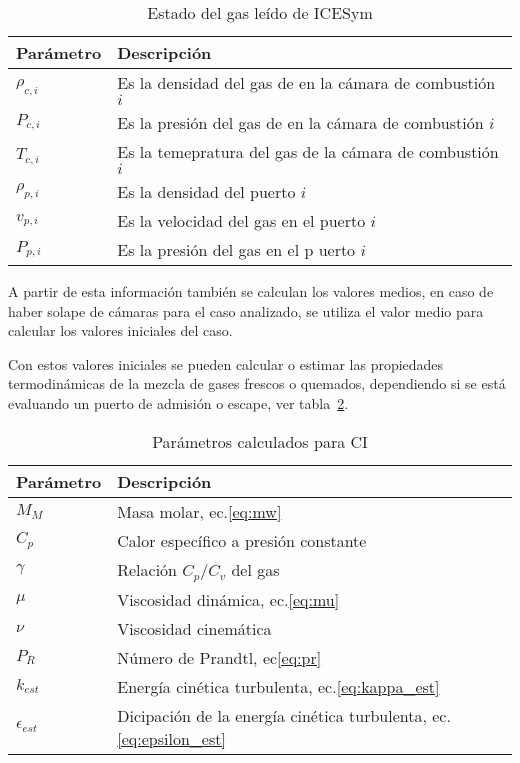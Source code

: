 \begin{table}
  \centering
  \begin{tabular}{ll}\toprule
    Parámetro & Descripción \\ \midrule
    $\rho_{c,i}$ & Es la densidad del gas de en la cámara de combustión $i$\\
    $P_{c,i}$ & Es la presión del gas de en la cámara de combustión $i$ \\
    $T_{c,i}$ & Es la temepratura del gas de la cámara de combustión $i$ \\
    $\rho_{p,i}$ & Es la densidad del puerto $i$ \\
    $v_{p,i}$ & Es la velocidad del gas en el puerto $i$ \\
    $P_{p,i}$ & Es la presión del gas en el p uerto $i$ \\ \bottomrule
    \end{tabular}
    \caption{Estado del gas leído de ICESym}\label{tab:estado_gas_icesym}
\end{table}

A partir de esta información también se calculan los valores medios, en caso de
haber solape de cámaras para el caso analizado, se utiliza el valor medio para
calcular los valores iniciales del caso.

Con estos valores iniciales se pueden calcular o estimar las propiedades
termodinámicas de la mezcla de gases frescos o quemados, dependiendo si se está
evaluando un puerto de admisión o escape, ver tabla~\ref{tab:ci_calculados}.
%

\begin{table}
  \centering
  \begin{tabular}{ll}\toprule
    Parámetro & Descripción \\ \midrule
    $M_{M}$ & Masa molar, ec.\ref{eq:mw} \\
    $C_{p}$ & Calor específico a presión constante \\
    $\gamma$ & Relación $C_{p}/C_{v}$ del gas \\
    $\mu$ & Viscosidad dinámica, ec.\ref{eq:mu} \\
    $\nu$ & Viscosidad cinemática \\
    $P_{R}$ & Número de Prandtl, ec\ref{eq:pr}\\
    $k_{est}$ & Energía cinética turbulenta, ec.\ref{eq:kappa_est} \\ \bottomrule
    $\epsilon_{est}$ & Dicipación de la energía cinética turbulenta, ec.\ref{eq:epsilon_est}\\
    \end{tabular}
    \caption{Parámetros calculados para CI}\label{tab:ci_calculados}
\end{table}

